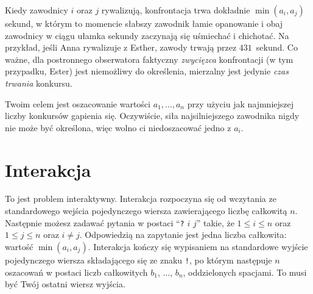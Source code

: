 \medskip
Kiedy zawodnicy $i$ oraz $j$ rywalizują, konfrontacja trwa dokładnie $\min(a_i, a_j)$ sekund, w którym to momencie słabszy zawodnik łamie opanowanie i obaj zawodnicy w ciągu ułamka sekundy zaczynają się uśmiechać i chichotać.
Na przykład, jeśli Anna rywalizuje z Esther, zawody trwają przez $431$~sekund.
Co ważne, dla postronnego obserwatora faktyczny \emph{zwycięzca} konfrontacji (w tym przypadku, Ester) jest niemożliwy do określenia, mierzalny jest jedynie \emph{czas trwania} konkursu.

Twoim celem jest oszacowanie wartości $a_1,\ldots, a_n$ przy użyciu jak najmniejszej liczby konkursów gapienia się.
Oczywiście, siła najsilniejszego zawodnika nigdy nie może być określona, więc wolno ci niedoszacować jedno z $a_i$.

\section*{Interakcja}

To jest problem interaktywny.
Interakcja rozpoczyna się od wczytania ze standardowego wejścia pojedynczego wiersza zawierającego liczbę całkowitą $n$.
Następnie możesz zadawać pytania w postaci ``\texttt{?} $i$ $j$'' takie, że $1\leq i\leq n$ oraz $1\leq j\leq n$ oraz $i\neq j$.
Odpowiedzią na zapytanie jest jedna liczba całkowita: wartość $\min(a_i, a_j)$.
Interakcja kończy się wypisaniem na standardowe wyjście pojedynczego wiersza składającego się ze znaku \texttt{!}, po którym następuje $n$ oszacowań w postaci liczb całkowitych $b_1$, $\ldots$, $b_n$, oddzielonych spacjami.
To musi być Twój ostatni wiersz wyjścia.

